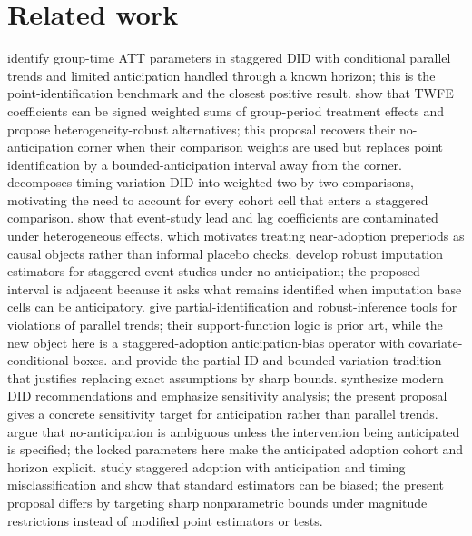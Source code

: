 \documentclass[11pt]{article}
\theoremstyle{definition}
\theoremstyle{plain}
\theoremstyle{remark}
\begin{document}
\section{Related work}
\citet{CallawaySantAnna2021} identify group-time ATT parameters in staggered DID with conditional parallel trends and limited anticipation handled through a known horizon; this is the point-identification benchmark and the closest positive result.  \citet{DCDH2020} show that TWFE coefficients can be signed weighted sums of group-period treatment effects and propose heterogeneity-robust alternatives; this proposal recovers their no-anticipation corner when their comparison weights are used but replaces point identification by a bounded-anticipation interval away from the corner.  \citet{GoodmanBacon2021} decomposes timing-variation DID into weighted two-by-two comparisons, motivating the need to account for every cohort cell that enters a staggered comparison.  \citet{SunAbraham2021} show that event-study lead and lag coefficients are contaminated under heterogeneous effects, which motivates treating near-adoption preperiods as causal objects rather than informal placebo checks.  \citet{BorusyakJaravelSpiess2024} develop robust imputation estimators for staggered event studies under no anticipation; the proposed interval is adjacent because it asks what remains identified when imputation base cells can be anticipatory.  \citet{RambachanRoth2023} give partial-identification and robust-inference tools for violations of parallel trends; their support-function logic is prior art, while the new object here is a staggered-adoption anticipation-bias operator with covariate-conditional boxes.  \citet{Manski2003} and \citet{ManskiPepper2018} provide the partial-ID and bounded-variation tradition that justifies replacing exact assumptions by sharp bounds.  \citet{RothSantAnnaBilinskiPoe2023} synthesize modern DID recommendations and emphasize sensitivity analysis; the present proposal gives a concrete sensitivity target for anticipation rather than parallel trends.  \citet{PiccininniTchetgenStensrud2025} argue that no-anticipation is ambiguous unless the intervention being anticipated is specified; the locked parameters here make the anticipated adoption cohort and horizon explicit.  \citet{AugustinGutknechtLiu2025} study staggered adoption with anticipation and timing misclassification and show that standard estimators can be biased; the present proposal differs by targeting sharp nonparametric bounds under magnitude restrictions instead of modified point estimators or tests.
\end{document}
